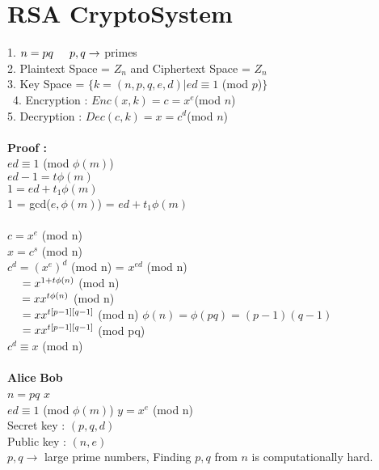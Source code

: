 \documentclass[11pt]{article}
\begin{document}
\section*{RSA CryptoSystem}
1. $n = pq \hspace{0.5cm} p,q \rightarrow$ primes \\ 
2. Plaintext Space = $Z_n$ and Ciphertext Space = $Z_n$ \\
3. Key Space = $ \{k = (n,p,q,e,d) \vert ed \equiv 1$ (mod $p$)$\}$\\\
4. Encryption : $Enc(x,k) = c = x^e$(mod $n$) \\
5. Decryption :  $Dec(c,k) = x = c^d$(mod $n$) \\
\\
\textbf{Proof :}\\
$ed \equiv 1$ (mod $\phi(m)$) \\
$ed - 1 = t\phi(m)$ \\
$1 = ed + t_1\phi(m)$ \\
1 = gcd($e,\phi(m)$) = $ed + t_1\phi(m)$ \\
\\
$c = x^e$ (mod n) \\
$x = c^s$ (mod n) \\
$c^d = (x^e)^d$ (mod n)  = $x^{ed}$ (mod n) \\
$\hspace*{0.45cm}= x^{1+t\phi(n)}$ (mod n) \\
$\hspace*{0.45cm}= x x^{t\phi(n)}$ (mod n) \\
$\hspace*{0.45cm}= x x^{t[p-1][q-1]}$ (mod n) \hspace{4cm} $\phi(n) = \phi(pq) = (p-1)(q-1)$\\
$\hspace*{0.45cm}=  x x^{t[p-1][q-1]}$ (mod pq) \\
$c^d \equiv x$ (mod n) \\
\\
\textbf{Alice} \hspace{7.5cm} \textbf{Bob} \\
$n = pq $ \hspace{7.5cm} $x$ \\
$ed \equiv 1$ (mod $\phi(m)$) \hspace{5.3cm} $y = x^e$ (mod n)\\
Secret key : $(p,q,d)$ \\
Public key : $(n,e)$ \\
$p,q \rightarrow$ large prime numbers, Finding $p,q$ from $n$ is computationally hard. \\
\end{document}
